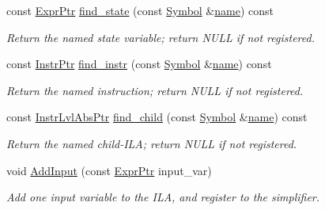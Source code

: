 \begin{DoxyCompactItemize}
const \mbox{\hyperlink{namespaceilang_a7c4196c72e53ea4df4b7861af7bc3bce}{Expr\+Ptr}} \mbox{\hyperlink{classilang_1_1_instr_lvl_abs_a01fecca943d1f13343c35d103f424bab}{find\+\_\+state}} (const \mbox{\hyperlink{classilang_1_1_symbol}{Symbol}} \&\mbox{\hyperlink{classilang_1_1_object_acf20b072e69f572910d7d80c93af0b38}{name}}) const
\begin{DoxyCompactList}\small\item\em Return the named state variable; return N\+U\+LL if not registered. \end{DoxyCompactList}\item 
\mbox{\label{classilang_1_1_instr_lvl_abs_acacc2efc3acf394976983ebef08a5fe9}} 
const \mbox{\hyperlink{namespaceilang_af88a19312ae653d687a0d1207bb284f6}{Instr\+Ptr}} \mbox{\hyperlink{classilang_1_1_instr_lvl_abs_acacc2efc3acf394976983ebef08a5fe9}{find\+\_\+instr}} (const \mbox{\hyperlink{classilang_1_1_symbol}{Symbol}} \&\mbox{\hyperlink{classilang_1_1_object_acf20b072e69f572910d7d80c93af0b38}{name}}) const
\begin{DoxyCompactList}\small\item\em Return the named instruction; return N\+U\+LL if not registered. \end{DoxyCompactList}\item 
\mbox{\label{classilang_1_1_instr_lvl_abs_add188173bbe3eb60bbb5f874f1639057}} 
const \mbox{\hyperlink{classilang_1_1_instr_lvl_abs_a743fd98e5ad145d70cb0dabf8db0007c}{Instr\+Lvl\+Abs\+Ptr}} \mbox{\hyperlink{classilang_1_1_instr_lvl_abs_add188173bbe3eb60bbb5f874f1639057}{find\+\_\+child}} (const \mbox{\hyperlink{classilang_1_1_symbol}{Symbol}} \&\mbox{\hyperlink{classilang_1_1_object_acf20b072e69f572910d7d80c93af0b38}{name}}) const
\begin{DoxyCompactList}\small\item\em Return the named child-\/\+I\+LA; return N\+U\+LL if not registered. \end{DoxyCompactList}\item 
void \mbox{\hyperlink{classilang_1_1_instr_lvl_abs_a7ee8ecc23167ed9dece4001c72ffcdff}{Add\+Input}} (const \mbox{\hyperlink{namespaceilang_a7c4196c72e53ea4df4b7861af7bc3bce}{Expr\+Ptr}} input\+\_\+var)
\begin{DoxyCompactList}\small\item\em Add one input variable to the I\+LA, and register to the simplifier. \end{DoxyCompactList}\item 

\end{DoxyCompactItemize}
